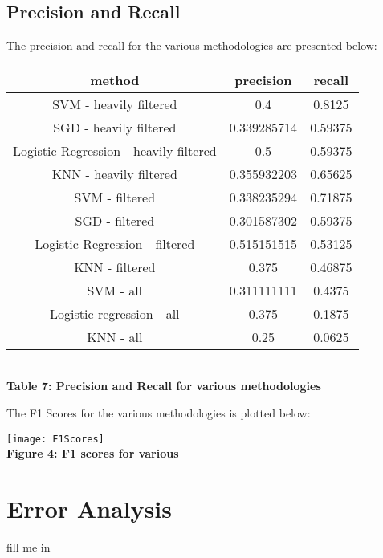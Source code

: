 \documentclass[12pt]{scrartcl}
\begin{document}
    \subsection{Precision and Recall}
    The precision and recall for the various methodologies are presented below:
    \begin{center}
    \begin{tabular}{|c|c|c|}
    \hline
    method & precision & recall\\
    \hline
    SVM - heavily filtered & 0.4 & 0.8125\\
    SGD - heavily filtered & 0.339285714 & 0.59375\\
    Logistic Regression - heavily filtered & 0.5 & 0.59375\\
    KNN - heavily filtered & 0.355932203 & 0.65625\\
    SVM - filtered & 0.338235294 & 0.71875\\
    SGD - filtered & 0.301587302    & 0.59375\\
    Logistic Regression - filtered & 0.515151515 & 0.53125\\
    KNN - filtered & 0.375 & 0.46875\\
    SVM - all & 0.311111111 & 0.4375\\
    Logistic regression - all & 0.375 & 0.1875\\
    KNN - all & 0.25 & 0.0625\\
    
    \hline
    \end{tabular}\\
    \vspace{0.1in}
    \textbf{Table 7: Precision and Recall for various methodologies}
    
    \end{center}
    
    
    
    The F1 Scores for the various methodologies is plotted below:
    
    \begin{center}
    \texttt{[image: F1Scores]}\\
    \textbf{Figure 4: F1 scores for various }
    \end{center}

    \section{Error Analysis}
    fill me in
    
    
    
\end{document}
